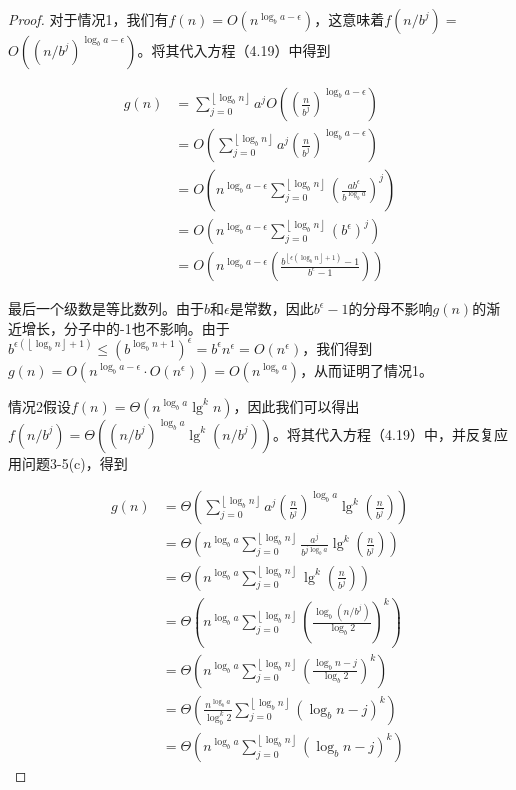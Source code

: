 \documentclass[lang=cn,newtx,10pt,scheme=chinese]{elegantbook}
\begin{document}
\begin{proof}
对于情况1，我们有$f(n)=O\left(n^{\log _b a-\epsilon}\right)$，这意味着$f\left(n / b^j\right)=$ $O\left(\left(n / b^j\right)^{\log _b a-\epsilon}\right)$。将其代入方程（4.19）中得到

$$
\begin{aligned}
g(n) & =\sum_{j=0}^{\left\lfloor\log _b n\right\rfloor} a^j O\left(\left(\frac{n}{b^j}\right)^{\log _b a-\epsilon}\right) \\
& =O\left(\sum_{j=0}^{\left\lfloor\log _b n\right\rfloor} a^j\left(\frac{n}{b^j}\right)^{\log _b a-\epsilon}\right) \\
& =O\left(n^{\log _b a-\epsilon} \sum_{j=0}^{\left\lfloor\log _b n\right\rfloor}\left(\frac{a b^\epsilon}{b^{\log _b a}}\right)^j\right) \\
& =O\left(n^{\log _b a-\epsilon} \sum_{j=0}^{\left\lfloor\log _b n\right\rfloor}\left(b^\epsilon\right)^j\right) \\
& =O\left(n^{\log _b a-\epsilon}\left(\frac{b^{\left\lfloor\epsilon\left(\log _b n\right\rfloor+1\right)}-1}{b^\epsilon-1}\right)\right)
\end{aligned}
$$

最后一个级数是等比数列。由于$b$和$\epsilon$是常数，因此$b^\epsilon-1$的分母不影响$g(n)$的渐近增长，分子中的-1也不影响。由于$b^{\epsilon\left(\left\lfloor\log _b n\right\rfloor+1\right)} \leq\left(b^{\log _b n+1}\right)^\epsilon=b^\epsilon n^\epsilon=O\left(n^\epsilon\right)$，我们得到$g(n)=O\left(n^{\log _b a-\epsilon} \cdot O\left(n^\epsilon\right)\right)=O\left(n^{\log _b a}\right)$，从而证明了情况1。

情况2假设$f(n)=\Theta\left(n^{\log _b a} \lg ^k n\right)$，因此我们可以得出$f\left(n / b^j\right)=\Theta\left(\left(n / b^j\right)^{\log _b a} \lg ^k\left(n / b^j\right)\right)$。将其代入方程（4.19）中，并反复应用问题3-5(c)，得到

$$
\begin{aligned}
g(n) & =\Theta\left(\sum_{j=0}^{\left\lfloor\log _b n\right\rfloor} a^j\left(\frac{n}{b^j}\right)^{\log _b a} \lg ^k\left(\frac{n}{b^j}\right)\right) \\
& =\Theta\left(n^{\log _b a} \sum_{j=0}^{\left\lfloor\log _b n\right\rfloor} \frac{a^j}{b^{j \log _b a}} \lg ^k\left(\frac{n}{b^j}\right)\right) \\
& =\Theta\left(n^{\log _b a} \sum_{j=0}^{\left\lfloor\log _b n\right\rfloor} \lg ^k\left(\frac{n}{b^j}\right)\right) \\
& =\Theta\left(n^{\log _b a} \sum_{j=0}^{\left\lfloor\log _b n\right\rfloor}\left(\frac{\log _b\left(n / b^j\right)}{\log _b 2}\right)^k\right) \\
& =\Theta\left(n^{\log _b a} \sum_{j=0}^{\left\lfloor\log _b n\right\rfloor}\left(\frac{\log _b n-j}{\log _b 2}\right)^k\right) \\
& =\Theta\left(\frac{n^{\log _b a}}{\log _b^k 2} \sum_{j=0}^{\left\lfloor\log _b n\right\rfloor}\left(\log _b n-j\right)^k\right) \\
& =\Theta\left(n^{\log _b a} \sum_{j=0}^{\left\lfloor\log _b n\right\rfloor}\left(\log _b n-j\right)^k\right)
\end{aligned}
$$


\end{proof}
\end{document}
